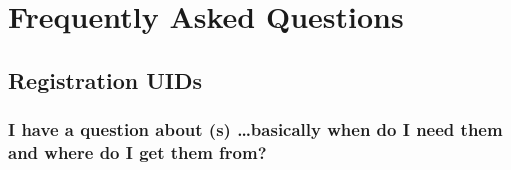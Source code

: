 % 
% 
% 
% 
% 
% 

\section{Frequently Asked Questions}
\label{sec:faq}

\subsection{Registration UIDs}
\label{faq:reguid-faq}

\subsubsection*{I have a question about (s) 
\ldots basically when do I need them and where do I get them from?}


